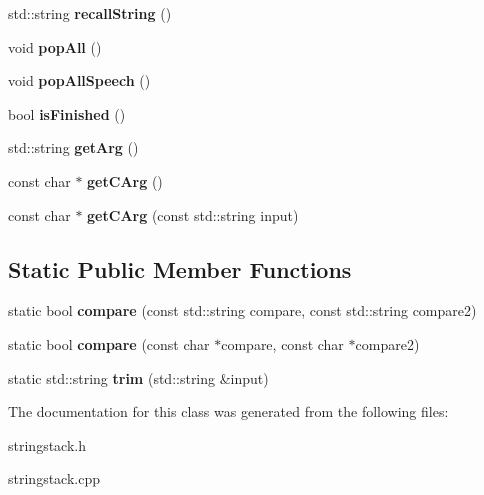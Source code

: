 \begin{DoxyCompactItemize}
\item 
\hypertarget{classStringstack_aaf7895e4f440740cc8170980c1140be3}{std\-::string {\bfseries recall\-String} ()}\label{classStringstack_aaf7895e4f440740cc8170980c1140be3}

\item 
\hypertarget{classStringstack_a787094ae6c979c8d1f81498b0743f4ad}{void {\bfseries pop\-All} ()}\label{classStringstack_a787094ae6c979c8d1f81498b0743f4ad}

\item 
\hypertarget{classStringstack_a867ab3e162e7ae1012d105b8a210df50}{void {\bfseries pop\-All\-Speech} ()}\label{classStringstack_a867ab3e162e7ae1012d105b8a210df50}

\item 
\hypertarget{classStringstack_afe0023a8e89792617fd595d400571faa}{bool {\bfseries is\-Finished} ()}\label{classStringstack_afe0023a8e89792617fd595d400571faa}

\item 
\hypertarget{classStringstack_a97dbddf508815857bf97c7310b70c913}{std\-::string {\bfseries get\-Arg} ()}\label{classStringstack_a97dbddf508815857bf97c7310b70c913}

\item 
\hypertarget{classStringstack_a246ba7090b700205b9e8321902fa6e5c}{const char $\ast$ {\bfseries get\-C\-Arg} ()}\label{classStringstack_a246ba7090b700205b9e8321902fa6e5c}

\item 
\hypertarget{classStringstack_aaeea1c99e035be5237e18477f5a00afd}{const char $\ast$ {\bfseries get\-C\-Arg} (const std\-::string input)}\label{classStringstack_aaeea1c99e035be5237e18477f5a00afd}

\end{DoxyCompactItemize}
\subsection*{Static Public Member Functions}
\begin{DoxyCompactItemize}
\item 
\hypertarget{classStringstack_a3a92a82a838b77bedc268372e8fe7a41}{static bool {\bfseries compare} (const std\-::string compare, const std\-::string compare2)}\label{classStringstack_a3a92a82a838b77bedc268372e8fe7a41}

\item 
\hypertarget{classStringstack_a8d8758c37734f6f45d6f5177dcc1a922}{static bool {\bfseries compare} (const char $\ast$compare, const char $\ast$compare2)}\label{classStringstack_a8d8758c37734f6f45d6f5177dcc1a922}

\item 
\hypertarget{classStringstack_ad7a1dcd59e92618fc6a52bba41e5854c}{static std\-::string {\bfseries trim} (std\-::string \&input)}\label{classStringstack_ad7a1dcd59e92618fc6a52bba41e5854c}

\end{DoxyCompactItemize}


The documentation for this class was generated from the following files\-:\begin{DoxyCompactItemize}
\item 
stringstack.\-h\item 
stringstack.\-cpp\end{DoxyCompactItemize}
